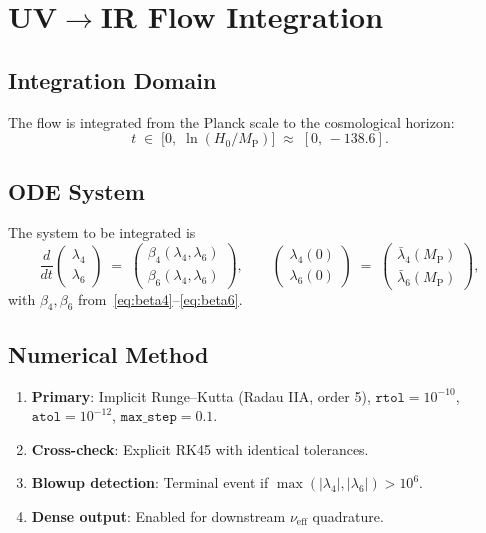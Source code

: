 \documentclass[11pt,a4paper]{article}
\theoremstyle{definition}
\theoremstyle{plain}
\theoremstyle{remark}
\newcommand{\MP}{M_{\mathrm{P}}}
\newcommand{\Hzero}{H_0}
\newcommand{\nueff}{\nu_{\mathrm{eff}}}
\begin{document}
\section{UV$\to$IR Flow Integration}
\label{sec:flow}

\subsection{Integration Domain}

The flow is integrated from the Planck scale to the cosmological horizon:
\begin{equation}
  t \;\in\;
  \bigl[0,\;\ln(\Hzero/\MP)\bigr]
  \;\approx\;
  [0,\,-138.6].
  \label{eq:t_range}
\end{equation}

\subsection{ODE System}

The system to be integrated is
\begin{equation}
  \frac{d}{dt}\begin{pmatrix}\lambda_4\\\lambda_6\end{pmatrix}
  \;=\;
  \begin{pmatrix}\beta_4(\lambda_4,\lambda_6)\\\beta_6(\lambda_4,\lambda_6)\end{pmatrix},
  \qquad
  \begin{pmatrix}\lambda_4(0)\\\lambda_6(0)\end{pmatrix}
  \;=\;
  \begin{pmatrix}\bar\lambda_4(\MP)\\\bar\lambda_6(\MP)\end{pmatrix},
  \label{eq:ode}
\end{equation}
with $\beta_4,\beta_6$ from~\eqref{eq:beta4}--\eqref{eq:beta6}.

\subsection{Numerical Method}

\begin{enumerate}[nosep]
  \item \textbf{Primary}: Implicit Runge--Kutta (Radau IIA, order 5),
        $\texttt{rtol}=10^{-10}$, $\texttt{atol}=10^{-12}$,
        $\texttt{max\_step}=0.1$.
  \item \textbf{Cross-check}: Explicit RK45 with identical tolerances.
  \item \textbf{Blowup detection}: Terminal event if
        $\max(|\lambda_4|,|\lambda_6|)>10^6$.
  \item \textbf{Dense output}: Enabled for downstream $\nueff$ quadrature.
\end{enumerate}
\end{document}
